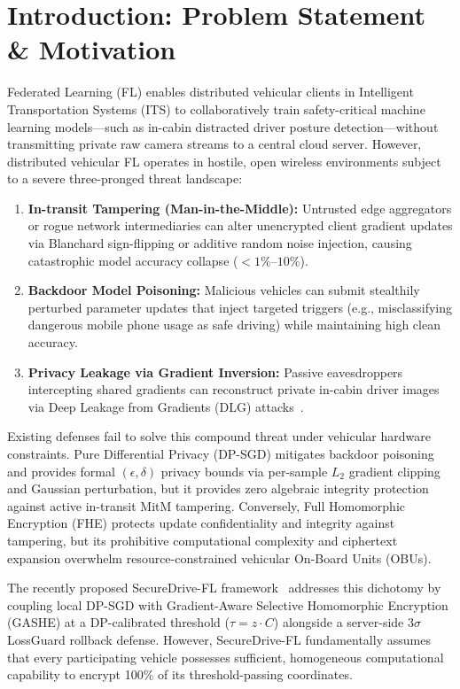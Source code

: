 \documentclass[acmtog,nonacm]{acmart}
\begin{document}
\section{Introduction: Problem Statement \& Motivation}
Federated Learning (FL) enables distributed vehicular clients in Intelligent Transportation Systems (ITS) to collaboratively train safety-critical machine learning models---such as in-cabin distracted driver posture detection---without transmitting private raw camera streams to a central cloud server. However, distributed vehicular FL operates in hostile, open wireless environments subject to a severe three-pronged threat landscape:
\begin{enumerate}
    \item \textbf{In-transit Tampering (Man-in-the-Middle):} Untrusted edge aggregators or rogue network intermediaries can alter unencrypted client gradient updates via Blanchard sign-flipping or additive random noise injection, causing catastrophic model accuracy collapse ($<1\%\text{--}10\%$).
    \item \textbf{Backdoor Model Poisoning:} Malicious vehicles can submit stealthily perturbed parameter updates that inject targeted triggers (e.g., misclassifying dangerous mobile phone usage as safe driving) while maintaining high clean accuracy.
    \item \textbf{Privacy Leakage via Gradient Inversion:} Passive eavesdroppers intercepting shared gradients can reconstruct private in-cabin driver images via Deep Leakage from Gradients (DLG) attacks~\cite{du2024sok,gong2026ares,li2025cggl}.
\end{enumerate}

Existing defenses fail to solve this compound threat under vehicular hardware constraints. Pure Differential Privacy (DP-SGD) mitigates backdoor poisoning and provides formal $(\epsilon, \delta)$ privacy bounds via per-sample $L_2$ gradient clipping and Gaussian perturbation, but it provides zero algebraic integrity protection against active in-transit MitM tampering. Conversely, Full Homomorphic Encryption (FHE) protects update confidentiality and integrity against tampering, but its prohibitive computational complexity and ciphertext expansion overwhelm resource-constrained vehicular On-Board Units (OBUs).

The recently proposed SecureDrive-FL framework~\cite{gul2026securedrive} addresses this dichotomy by coupling local DP-SGD with Gradient-Aware Selective Homomorphic Encryption (GASHE) at a DP-calibrated threshold ($\tau = z \cdot C$) alongside a server-side $3\sigma$ LossGuard rollback defense. However, SecureDrive-FL fundamentally assumes that every participating vehicle possesses sufficient, homogeneous computational capability to encrypt 100\% of its threshold-passing coordinates.
\end{document}

